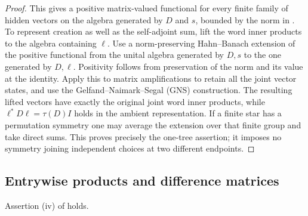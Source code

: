 \begin{proof}
This gives a positive matrix-valued functional for every finite
family of hidden vectors on the algebra generated by $D$ and $s$,
bounded by the norm in .  To represent
creation as well as the self-adjoint sum, lift the word inner products
to the algebra containing $\ell$.  Use a norm-preserving
Hahn--Banach extension of the positive functional from the unital
algebra generated by $D,s$ to the one generated by $D,\ell$.
Positivity follows from preservation of the norm and its value at the
identity.  Apply this to matrix amplifications to retain all the joint
vector states, and use the Gelfand--Naimark--Segal (GNS) construction.
The resulting lifted
vectors have exactly the original joint word inner products, while
$\ell^*D\ell=\tau(D)I$ holds in the ambient representation.
If a finite star has a permutation symmetry one may average the
extension over that finite group and take direct sums.  This proves
precisely the one-tree assertion; it imposes no symmetry joining
independent choices at two different endpoints.
\end{proof}

\subsection{Entrywise products and difference matrices}

\begin{lemma}
\label{lem:path-hadamard}
Assertion \textup{(iv)} of  holds.
\end{lemma}

